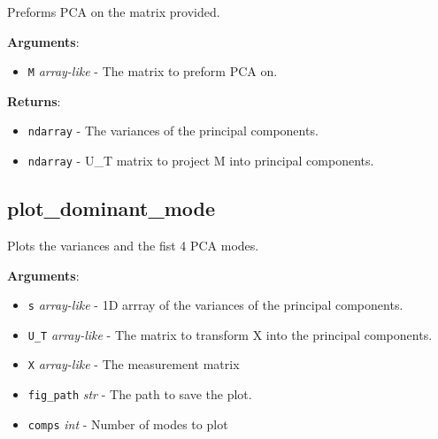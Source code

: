 Preforms PCA on the matrix provided.

\textbf{Arguments}:

\begin{itemize}
\tightlist
\item
  \texttt{M} \emph{array-like} - The matrix to preform PCA on.
\end{itemize}

\textbf{Returns}:

\begin{itemize}
\tightlist
\item
  \texttt{ndarray} - The variances of the principal components.
\item
  \texttt{ndarray} - U\_T matrix to project M into principal components.
\end{itemize}

\subsection{plot\_dominant\_mode}

\begin{Shaded}
\begin{Highlighting}[]
\end{Highlighting}
\end{Shaded}

Plots the variances and the fist 4 PCA modes.

\textbf{Arguments}:

\begin{itemize}
\tightlist
\item
  \texttt{s} \emph{array-like} - 1D arrray of the variances of the
  principal components.
\item
  \texttt{U\_T} \emph{array-like} - The matrix to transform X into the
  principal components.
\item
  \texttt{X} \emph{array-like} - The measurement matrix
\item
  \texttt{fig\_path} \emph{str} - The path to save the plot.
\item
  \texttt{comps} \emph{int} - Number of modes to plot
\end{itemize}
